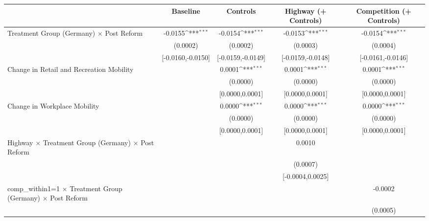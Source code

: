 {
\def\sym#1{\ifmmode^{#1}\else\(^{#1}\)\fi}
\begin{tabular}{l*{4}{c}}
\toprule
                    &\multicolumn{1}{c}{Baseline}&\multicolumn{1}{c}{Controls}&\multicolumn{1}{c}{Highway (+ Controls)}&\multicolumn{1}{c}{Competition (+ Controls)}\\
\midrule
Treatment Group (Germany) $\times$ Post Reform&     -0.0155\sym{***}&     -0.0154\sym{***}&     -0.0153\sym{***}&     -0.0154\sym{***}\\
                    &    (0.0002)         &    (0.0002)         &    (0.0003)         &    (0.0004)         \\
                    &[-0.0160,-0.0150]         &[-0.0159,-0.0149]         &[-0.0159,-0.0148]         &[-0.0161,-0.0146]         \\
Change in Retail and Recreation Mobility&                     &      0.0001\sym{***}&      0.0001\sym{***}&      0.0001\sym{***}\\
                    &                     &    (0.0000)         &    (0.0000)         &    (0.0000)         \\
                    &                     &[0.0000,0.0001]         &[0.0000,0.0001]         &[0.0000,0.0001]         \\
Change in Workplace Mobility&                     &      0.0000\sym{***}&      0.0000\sym{***}&      0.0000\sym{***}\\
                    &                     &    (0.0000)         &    (0.0000)         &    (0.0000)         \\
                    &                     &[0.0000,0.0001]         &[0.0000,0.0001]         &[0.0000,0.0001]         \\
Highway $\times$ Treatment Group (Germany) $\times$ Post Reform&                     &                     &      0.0010         &                     \\
                    &                     &                     &    (0.0007)         &                     \\
                    &                     &                     &[-0.0004,0.0025]         &                     \\
comp\_within1=1 $\times$ Treatment Group (Germany) $\times$ Post Reform&                     &                     &                     &     -0.0002         \\
                    &                     &                     &                     &    (0.0005)         \\

\end{tabular}}
